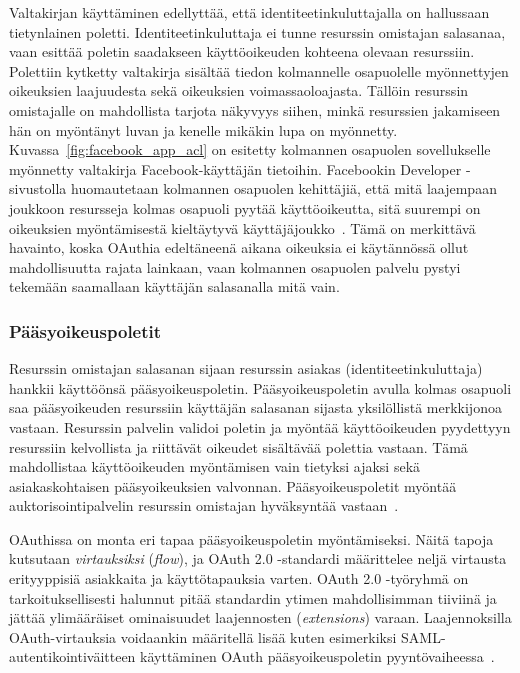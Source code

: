 \documentclass[finnish,gradu]{tktltiki}
\begin{document}
  Valtakirjan käyttäminen edellyttää, että identiteetinkuluttajalla on hallussaan tietynlainen poletti.   Identiteetinkuluttaja ei tunne resurssin omistajan salasanaa, vaan esittää poletin saadakseen käyttöoikeuden kohteena olevaan resurssiin. Polettiin kytketty valtakirja sisältää tiedon kolmannelle osapuolelle myönnettyjen oikeuksien laajuudesta sekä oikeuksien voimassaoloajasta. Tällöin resurssin omistajalle on mahdollista tarjota näkyvyys siihen, minkä resurssien jakamiseen hän on myöntänyt luvan ja kenelle mikäkin lupa on myönnetty. Kuvassa~\ref{fig:facebook_app_acl} on esitetty kolmannen osapuolen sovellukselle myönnetty valtakirja Facebook-käyttäjän tietoihin. Facebookin Developer -sivustolla huomautetaan kolmannen osapuolen kehittäjiä, että mitä laajempaan joukkoon resursseja kolmas osapuoli pyytää käyttöoikeutta, sitä suurempi on oikeuksien myöntämisestä kieltäytyvä käyttäjäjoukko~\cite{facebook_oauth2_doc}. Tämä on merkittävä havainto, koska OAuthia edeltäneenä aikana oikeuksia ei käytännössä ollut mahdollisuutta rajata lainkaan, vaan kolmannen osapuolen palvelu pystyi tekemään saamallaan käyttäjän salasanalla mitä vain.

  \subsubsection{Pääsyoikeuspoletit} %
  \label{ssub:oauth_tokenit}

  Resurssin omistajan salasanan sijaan resurssin asiakas (identiteetinkuluttaja) hankkii käyttöönsä pääsyoikeuspoletin. Pääsyoikeuspoletin avulla kolmas osapuoli saa pääsyoikeuden resurssiin käyttäjän salasanan sijasta yksilöllistä merkkijonoa vastaan. Resurssin palvelin validoi poletin ja myöntää käyttöoikeuden pyydettyyn resurssiin kelvollista ja riittävät oikeudet sisältävää polettia vastaan. Tämä mahdollistaa käyttöoikeuden myöntämisen vain tietyksi ajaksi sekä asiakaskohtaisen pääsyoikeuksien valvonnan. Pääsyoikeuspoletit myöntää auktorisointipalvelin resurssin omistajan hyväksyntää vastaan~\cite{ietf_oauth2}.

  OAuthissa on monta eri tapaa pääsyoikeuspoletin myöntämiseksi. Näitä tapoja kutsutaan \emph{virtauksiksi} (\emph{flow}), ja OAuth 2.0 -standardi määrittelee neljä virtausta erityyppisiä asiakkaita ja käyttötapauksia varten. OAuth 2.0 -työryhmä on tarkoituksellisesti halunnut pitää standardin ytimen mahdollisimman tiiviinä ja jättää ylimääräiset ominaisuudet laajennosten (\emph{extensions}) varaan. Laajennoksilla OAuth-virtauksia voidaankin määritellä lisää kuten esimerkiksi SAML-autentikointiväitteen käyttäminen OAuth pääsyoikeuspoletin pyyntövaiheessa~\cite{ietf_oauth2_saml_bearer}.
\end{document}
